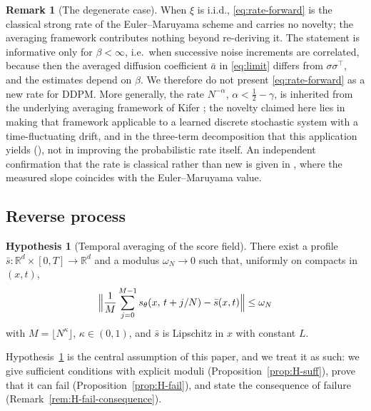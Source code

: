 \documentclass[a4paper,fleqn]{cas-dc}
\theoremstyle{definition}
\newtheorem{hypothesis}{Hypothesis}
\newtheorem{remark}[theorem]{Remark}
\newcommand{\R}{\mathbb{R}}
\begin{document}
\begin{remark}[The degenerate case]
\label{rem:degenerate}
When $\xi$ is i.i.d., \eqref{eq:rate-forward} is the classical strong rate of the
Euler--Maruyama scheme and carries no novelty; the averaging framework contributes
nothing beyond re-deriving it. The statement is informative only for $\beta<\infty$,
i.e.\ when successive noise increments are correlated, because then the averaged
diffusion coefficient $\bar a$ in \eqref{eq:limit} differs from $\sigma\sigma^{\top}$,
and the estimates depend on $\beta$. We therefore do not present
\eqref{eq:rate-forward} as a new rate for DDPM. More generally, the rate
$N^{-\alpha}$, $\alpha<\tfrac12-\gamma$, is inherited from the underlying averaging
framework of Kifer \cite{kifer2025}; the novelty claimed here lies in making that framework
applicable to a learned discrete stochastic system with a time-fluctuating drift, and
in the three-term decomposition that this application yields
(), not in improving the probabilistic rate itself. An independent
confirmation that the rate is classical rather than new is given in ,
where the measured slope coincides with the Euler--Maruyama value.
\end{remark}

\subsection{Reverse process}


\begin{hypothesis}[Temporal averaging of the score field]
\label{hyp:H}
There exist a profile $\bar s:\R^{d}\times[0,T]\to\R^{d}$ and a modulus
$\omega_{N}\to0$ such that, uniformly on compacts in $(x,t)$,
\begin{equation}
\Bigl\lVert \frac{1}{M}\sum_{j=0}^{M-1} s_{\theta}(x,\,t+j/N) - \bar s(x,t)\Bigr\rVert
\le \omega_{N}
\end{equation}
with $M=\lfloor N^{\kappa}\rfloor$, $\kappa\in(0,1)$,
and $\bar s$ is Lipschitz in $x$ with constant $L$.
\end{hypothesis}

Hypothesis~\ref{hyp:H} is the central assumption of this paper, and we
treat it as such: we give sufficient conditions with explicit moduli
(Proposition~\ref{prop:H-suff}), prove that it can fail (Proposition~\ref{prop:H-fail}), and state the
consequence of failure (Remark~\ref{rem:H-fail-consequence}).
\end{document}
